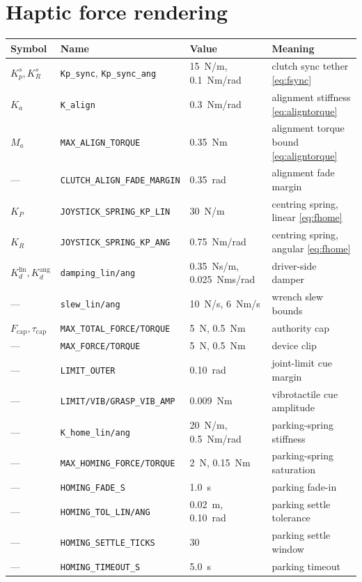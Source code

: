 \section{Haptic force rendering}
\begin{tabularx}{\linewidth}{@{}l>{\scriptsize}ll>{\raggedright\arraybackslash}X@{}}
\toprule
Symbol & Name & Value & Meaning \\
\midrule
$K_p^{s}, K_R^{s}$ & \texttt{Kp\_sync}, \texttt{Kp\_sync\_ang} & 15~N/m, 0.1~Nm/rad & clutch sync tether \eqref{eq:fsync} \\
$K_a$ & \texttt{K\_align} & 0.3~Nm/rad & alignment stiffness \eqref{eq:aligntorque} \\
$M_a$ & \texttt{MAX\_ALIGN\_TORQUE} & 0.35~Nm & alignment torque bound \eqref{eq:aligntorque} \\
--- & \texttt{CLUTCH\_ALIGN\_FADE\_MARGIN} & 0.35~rad & alignment fade margin \\
$K_P$ & \texttt{JOYSTICK\_SPRING\_KP\_LIN} & 30~N/m & centring spring, linear \eqref{eq:fhome} \\
$K_R$ & \texttt{JOYSTICK\_SPRING\_KP\_ANG} & 0.75~Nm/rad & centring spring, angular \eqref{eq:fhome} \\
$K_d^{\text{lin}}, K_d^{\text{ang}}$ & \texttt{damping\_lin/ang} & 0.35~Ns/m, 0.025~Nms/rad & driver-side damper \\
--- & \texttt{slew\_lin/ang} & 10~N/s, 6~Nm/s & wrench slew bounds \\
$F_{\text{cap}}, \tau_{\text{cap}}$ & \texttt{MAX\_TOTAL\_FORCE/TORQUE} & 5~N, 0.5~Nm & authority cap \\
--- & \texttt{MAX\_FORCE/TORQUE} & 5~N, 0.5~Nm & device clip \\
--- & \texttt{LIMIT\_OUTER} & 0.10~rad & joint-limit cue margin \\
--- & \texttt{LIMIT/VIB/GRASP\_VIB\_AMP} & 0.009~Nm & vibrotactile cue amplitude \\
--- & \texttt{K\_home\_lin/ang} & 20~N/m, 0.5~Nm/rad & parking-spring stiffness \\
--- & \texttt{MAX\_HOMING\_FORCE/TORQUE} & 2~N, 0.15~Nm & parking-spring saturation \\
--- & \texttt{HOMING\_FADE\_S} & 1.0~s & parking fade-in \\
--- & \texttt{HOMING\_TOL\_LIN/ANG} & 0.02~m, 0.10~rad & parking settle tolerance \\
--- & \texttt{HOMING\_SETTLE\_TICKS} & 30 & parking settle window \\
--- & \texttt{HOMING\_TIMEOUT\_S} & 5.0~s & parking timeout \\
\bottomrule
\end{tabularx}

